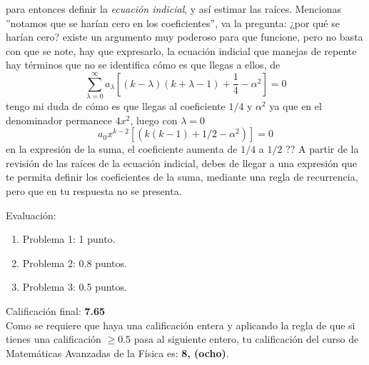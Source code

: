 \begin{enumerate}
para entonces definir la \emph{ecuación indicial}, y así estimar las raíces. Mencionas ''notamos que se harían cero en los coeficientes'', va la pregunta: ¿por qué se harían cero? existe un argumento muy poderoso para que funcione, pero no basta con que se note, hay que expresarlo, la ecuación indicial que manejas de repente hay términos que no se identifica cómo es que llegas a ellos, de
\[ \sum_{\lambda=0}^{\infty} a_{\lambda} \left[ (k-\lambda)(k+\lambda-1) + \dfrac{1}{4} - \alpha^{2} \right] = 0 \]
tengo mi duda de cómo es que llegas al coeficiente $1/4$ y $\alpha^{2}$ ya que en el denominador permanece $4x^{2}$, luego con $\lambda=0$
\[ a_{0} x^{k-2} [(k(k-1) + 1/2 - \alpha^{2})] = 0 \]
en la expresión de la suma, el coeficiente aumenta de $1/4$ a $1/2$ ??
A partir de la revisión de las raíces de la ecuación indicial, debes de llegar a una expresión que te permita definir los coeficientes de la suma, mediante una regla de recurrencia, pero que en tu respuesta no se presenta.
\end{enumerate}
Evaluación:
\begin{enumerate}
\item Problema 1: 1 punto.
\item Problema 2: 0.8 puntos.
\item Problema 3: 0.5 puntos.
\end{enumerate}
Calificación final: \textbf{7.65}
\\
Como se requiere que haya una calificación entera y aplicando la regla de que si tienes una calificación $\geq 0.5$ pasa al siguiente entero, tu calificación del curso de Matemáticas Avanzadas de la Física es: \textbf{8, (ocho)}.
